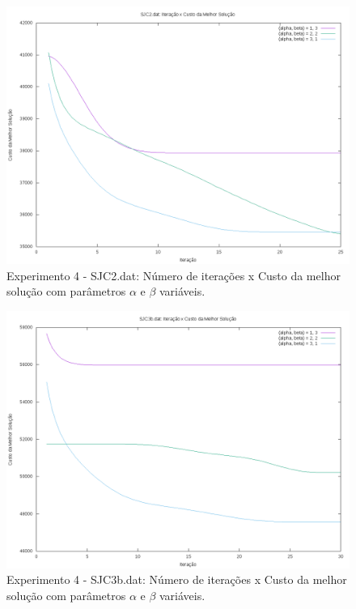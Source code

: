 \documentclass[12pt]{article}
\begin{document}
\begin{figure}[!htbp]
  \centering
  \includegraphics[width=1\textwidth]{exp4s2.png}
  \caption{Experimento 4 - SJC2.dat: Número de iterações x Custo da melhor solução com parâmetros $\alpha$ 
  e $\beta$ variáveis.}
  \label{fig:exp4s2}
\end{figure}

\begin{figure}[!htbp]
  \centering
  \includegraphics[width=1\textwidth]{exp4s3.png}
  \caption{Experimento 4 - SJC3b.dat: Número de iterações x Custo da melhor solução com parâmetros $\alpha$ 
  e $\beta$ variáveis.}
  \label{fig:exp4s3}
\end{figure}
\end{document}
